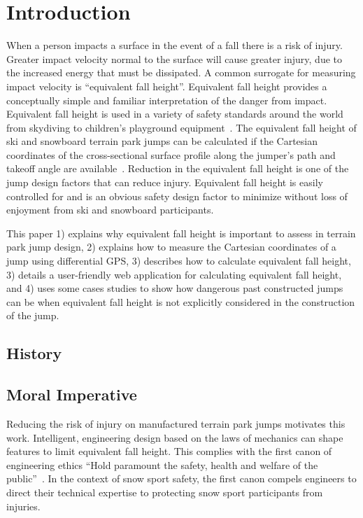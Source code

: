 \documentclass{article}
\begin{document}
\begin{abstract}
\end{abstract}

\section{Introduction}
%
When a person impacts a surface in the event of a fall there is a risk of
injury. Greater impact velocity normal to the surface will cause greater
injury, due to the increased energy that must be dissipated. A common surrogate
for measuring impact velocity is ``equivalent fall height''.  Equivalent fall
height provides a conceptually simple and familiar interpretation of the danger
from impact. Equivalent fall height is used in a variety of safety standards
around the world from skydiving to children's playground
equipment~\cite{Chalmers1996}. The equivalent fall height of ski and snowboard
terrain park jumps can be calculated if the Cartesian coordinates of the
cross-sectional surface profile along the jumper's path and takeoff angle are
available~\cite{Hubbard2012}. Reduction in the equivalent fall height is one of
the jump design factors that can reduce injury. Equivalent fall height is
easily controlled for and is an obvious safety design factor to minimize
without loss of enjoyment from ski and snowboard participants.

This paper 1) explains why equivalent fall height is important to assess in
terrain park jump design, 2) explains how to measure the Cartesian coordinates
of a jump using differential GPS, 3) describes how to calculate equivalent fall
height, 3) details a user-friendly web application for calculating equivalent
fall height, and 4) uses some cases studies to show how dangerous past
constructed jumps can be when equivalent fall height is not explicitly
considered in the construction of the jump.

\subsection{History}
%

\subsection{Moral Imperative}
%
Reducing the risk of injury on manufactured terrain park jumps motivates this
work. Intelligent, engineering design based on the laws of mechanics can shape
features to limit equivalent fall height. This complies with the first canon of
engineering ethics ``Hold paramount the safety, health and welfare of the
public''~\cite{NSPE2019}. In the context of snow sport safety, the first canon
compels engineers to direct their technical expertise to protecting snow sport
participants from injuries.
\end{document}

